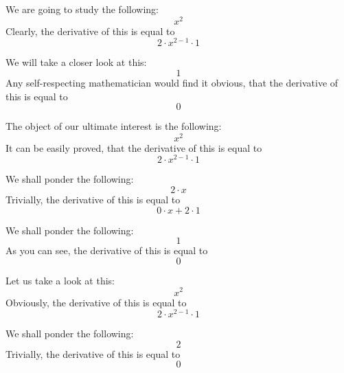 \documentclass{article}
\begin{document}
We are going to study the following:
\begin{equation}
x ^{2 } 
\end{equation}
Clearly, the derivative of this is equal to
\begin{equation}
2 \cdot x ^{2 - 1 } \cdot 1 
\end{equation}

We will take a closer look at this:
\begin{equation}
1 
\end{equation}
Any self-respecting mathematician would find it obvious, that the derivative of this is equal to
\begin{equation}
0 
\end{equation}

The object of our ultimate interest is the following:
\begin{equation}
x ^{2 } 
\end{equation}
It can be easily proved, that the derivative of this is equal to
\begin{equation}
2 \cdot x ^{2 - 1 } \cdot 1 
\end{equation}

We shall ponder the following:
\begin{equation}
2 \cdot x 
\end{equation}
Trivially, the derivative of this is equal to
\begin{equation}
0 \cdot x + 2 \cdot 1 
\end{equation}

We shall ponder the following:
\begin{equation}
1 
\end{equation}
As you can see, the derivative of this is equal to
\begin{equation}
0 
\end{equation}

Let us take a look at this:
\begin{equation}
x ^{2 } 
\end{equation}
Obviously, the derivative of this is equal to
\begin{equation}
2 \cdot x ^{2 - 1 } \cdot 1 
\end{equation}

We shall ponder the following:
\begin{equation}
2 
\end{equation}
Trivially, the derivative of this is equal to
\begin{equation}
0 
\end{equation}
\end{document}

